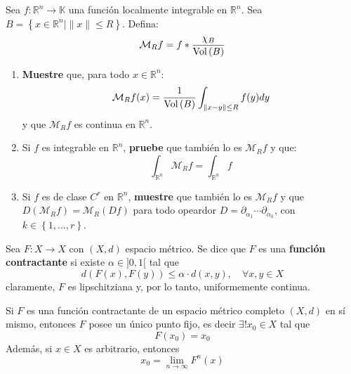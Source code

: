 \documentclass[12pt]{report}
\theoremstyle{largebreak}
\newcommand\cf[3]{\ensuremath{#1:#2\rightarrow#3}}
\newcommand{\Vol}[1]{\ensuremath{\textup{Vol}\left(#1\right)}}
\begin{document}
    \begin{excer}
        Sea $\cf{f}{\mathbb{R}^n}{\mathbb{K}}$ una función localmente integrable en $\mathbb{R}^n$. Sea $B=\left\{x\in\mathbb{R}^n\Big|\|x\|\leq R \right\}$. Defina:
        \begin{equation*}
            \mathcal{M}_Rf=f*\frac{\chi_B}{\Vol{B}}
        \end{equation*}
        \begin{enumerate}
            \item \textbf{Muestre} que, para todo $x\in\mathbb{R}^n$:
            \begin{equation*}
                \mathcal{M}_Rf(x)=\frac{1}{\Vol{B}}\int_{\|x-y\|\leq R}f(y)dy
            \end{equation*}
            y que $\mathcal{M}_Rf$ es continua en $\mathbb{R}^n$.
            \item Si $f$ es integrable en $\mathbb{R}^n$, \textbf{pruebe} que también lo es $\mathcal{M}_Rf$ y que:
            \begin{equation*}
                \int_{\mathbb{R}^n}\mathcal{M}_Rf=\int_{\mathbb{R}^n}f
            \end{equation*}
            \item Si $f$ es de clase $C^r$ en $\mathbb{R}^n$, \textbf{muestre} que también lo es $\mathcal{M}_Rf$ y que $D(\mathcal{M}_Rf)=\mathcal{M}_R(Df)$ para todo opeardor $D=\partial_{\alpha_1}\cdots\partial_{\alpha_k}$, con $k\in\left\{1,...,r \right\}$.
        \end{enumerate}
    \end{excer}
    
    \begin{sol}
        
    \end{sol}

    \begin{mydef}
        Sea $\cf{F}{X}{X}$ con $(X,d)$ espacio métrico. Se dice que $F$ es una \textbf{función contractante} si existe $\alpha\in]0,1[$ tal que
        \begin{equation*}
            d(F(x),F(y))\leq \alpha\cdot d(x,y),\quad\forall x,y\in X
        \end{equation*}
        claramente, $F$ es lipschitziana y, por lo tanto, uniformemente continua.
    \end{mydef}

    \begin{theor}
        Si $F$ es una función contractante de un espacio métrico completo $(X,d)$ en sí mismo, entonces $F$ posee un único punto fijo, es decir $\exists! x_0\in X$ tal que
         \begin{equation*}
            F(x_0)=x_0
         \end{equation*}
         Además, si $x\in X$ es arbitrario, entonces
         \begin{equation*}
            x_0=\lim_{ n\rightarrow\infty}F^n(x)
         \end{equation*}
    \end{theor}
\end{document}

